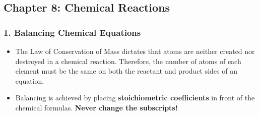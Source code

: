 \documentclass{article}
\begin{document}
\bigskip
\subsection*{Chapter 8: Chemical Reactions}

\subsubsection*{1. Balancing Chemical Equations}
\begin{itemize}[itemsep=5pt]
    \item The Law of Conservation of Mass dictates that atoms are neither created nor destroyed in a chemical reaction. Therefore, the number of atoms of each element must be the same on both the reactant and product sides of an equation.
    \item Balancing is achieved by placing \textbf{stoichiometric coefficients} in front of the chemical formulas. \textbf{Never change the subscripts!}
\end{itemize}
\end{document}
